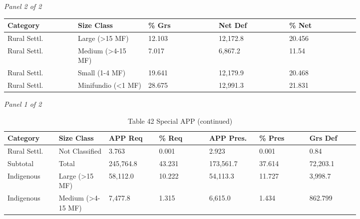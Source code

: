 \documentclass[12pt]{article}
\begin{document}
\begin{landscape}
\begin{table}[H]
\textit{Panel 2 of 2}\\[2pt]
{\fontsize{12}{14}\selectfont
\setlength{\tabcolsep}{3pt}
\renewcommand{\arraystretch}{1.08}
\begin{tabular}{p{0.164\linewidth}p{0.164\linewidth}p{0.164\linewidth}p{0.164\linewidth}p{0.164\linewidth}}
\toprule
Category & Size Class & \% Grs & Net Def & \% Net \\
\midrule
Rural Settl. & Large (>15 MF) & 12.103 & 12,172.8 & 20.456 \\
Rural Settl. & Medium (>4-15 MF) & 7.017 & 6,867.2 & 11.54 \\
Rural Settl. & Small (1-4 MF) & 19.641 & 12,179.9 & 20.468 \\
Rural Settl. & Minifundio (<1 MF) & 28.675 & 12,991.3 & 21.831 \\
\bottomrule
\end{tabular}
}
\end{table}
\begin{table}[H]
\centering
\caption{Table 42 Special APP (continued)}
\textit{Panel 1 of 2}\\[2pt]
{\fontsize{12}{14}\selectfont
\setlength{\tabcolsep}{3pt}
\renewcommand{\arraystretch}{1.08}
\begin{tabular}{p{0.117\linewidth}p{0.117\linewidth}p{0.117\linewidth}p{0.117\linewidth}p{0.117\linewidth}p{0.117\linewidth}p{0.117\linewidth}}
\toprule
Category & Size Class & APP Req & \% Req & APP Pres. & \% Pres & Grs Def \\
\midrule
Rural Settl. & Not Classified & 3.763 & 0.001 & 2.923 & 0.001 & 0.84 \\
Subtotal & Total & 245,764.8 & 43.231 & 173,561.7 & 37.614 & 72,203.1 \\
Indigenous & Large (>15 MF) & 58,112.0 & 10.222 & 54,113.3 & 11.727 & 3,998.7 \\
Indigenous & Medium (>4-15 MF) & 7,477.8 & 1.315 & 6,615.0 & 1.434 & 862.799 \\
\bottomrule
\end{tabular}
}

\vspace{0.6em}


\end{table}
\end{landscape}
\end{document}
